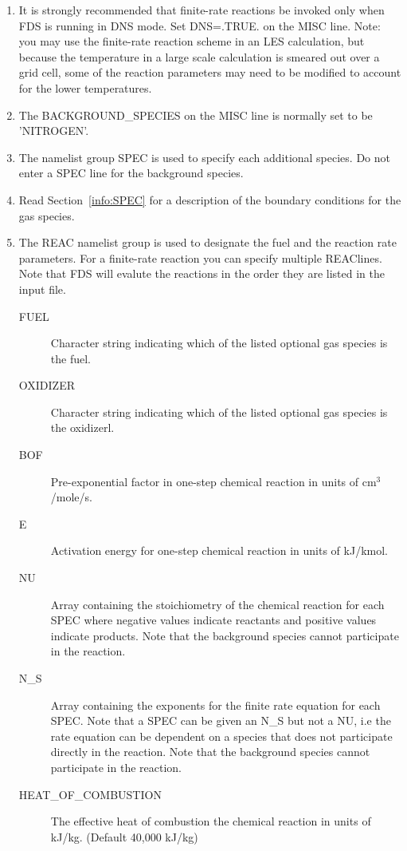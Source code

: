 \documentclass[11pt]{book}
\begin{document}
\begin{enumerate}
\item It is strongly recommended that finite-rate reactions be invoked only
when FDS is running in DNS mode. Set {\ct DNS=.TRUE.} on the {\ct MISC} line.
Note: you may use the finite-rate reaction scheme in an
LES calculation, but because the temperature in a large scale calculation
is smeared out over a grid cell, some of the reaction parameters may need
to be modified to account for the lower temperatures.

\item The {\ct BACKGROUND\_SPECIES} on the {\ct MISC} line is normally
set to be {\ct 'NITROGEN'}.

\item The namelist group {\ct SPEC} is used to specify each additional
species. Do not enter a {\ct SPEC} line for the background species.

\item Read Section~\ref{info:SPEC} for a description of the boundary
conditions for the gas species.

\item The {\ct REAC} namelist group is used to designate the fuel and the reaction rate
parameters.  For a finite-rate reaction you can specify multiple {\ct REAC}lines.  Note that
FDS will evalute the reactions in the order they are listed in the input file. %
\begin{description}
\item[{\ct FUEL}] Character string indicating which of the listed
optional gas species is the fuel.
\item[{\ct OXIDIZER}] Character string indicating which of the listed
optional gas species is the oxidizerl.
\item[{\ct BOF}] Pre-exponential factor in one-step chemical reaction in
units of cm$^3$/mole/s.
\item[{\ct E}] Activation energy for one-step chemical reaction in
units of kJ/kmol.
\item[{\ct NU}] Array containing the stoichiometry of the chemical reaction for each {\ct SPEC} where
negative values indicate reactants and positive values indicate products.  Note that the background species
cannot participate in the reaction.
\item[{\ct N\_S}] Array containing the exponents for the finite rate equation for each {\ct SPEC}.
Note that a {\ct SPEC} can be given an {\ct N\_S} but not a {\ct NU}, i.e the rate equation can
be dependent on a species that does not participate directly in the reaction.  Note that the background species
cannot participate in the reaction.
\item[{\ct HEAT\_OF\_COMBUSTION}] The effective heat of combustion the chemical reaction in units of kJ/kg. (Default 40,000 kJ/kg)
\end{description}

\end{enumerate}
\end{document}
